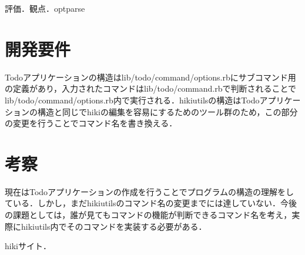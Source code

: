 \documentclass[a4j,twocolumn]{jsarticle}
\begin{document}
評価．観点．optparse

\section{開発要件}
Todoアプリケーションの構造はlib/todo/command/options.rbにサブコマンド用の定義があり，入力されたコマンドはlib/todo/command.rbで判断されることでlib/todo/command/options.rb内で実行される．hikiutilsの構造はTodoアプリケーションの構造と同じでhikiの編集を容易にするためのツール群のため，この部分の変更を行うことでコマンド名を書き換える．

\section{考察}
現在はTodoアプリケーションの作成を行うことでプログラムの構造の理解をしている．しかし，まだhikiutilsのコマンド名の変更までには達していない．今後の課題としては，誰が見てもコマンドの機能が判断できるコマンド名を考え，実際にhikiutils内でそのコマンドを実装する必要がある．

\begin{thebibliography}{9}
hikiサイト．
\end{thebibliography}
\end{document}
